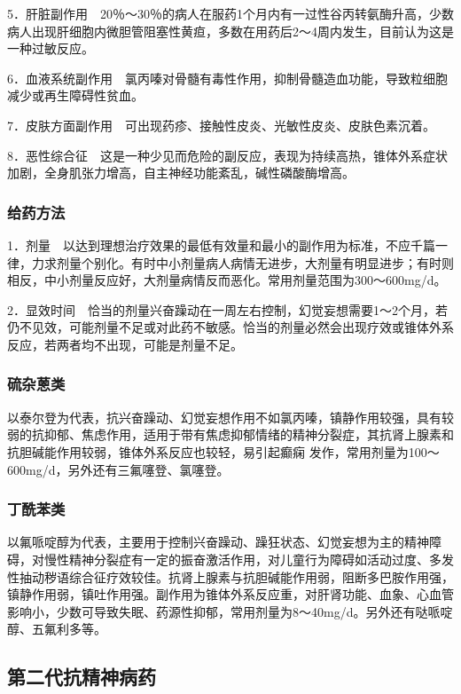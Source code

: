 5．肝脏副作用　20％～30％的病人在服药1个月内有一过性谷丙转氨酶升高，少数病人出现肝细胞内微胆管阻塞性黄疸，多数在用药后2～4周内发生，目前认为这是一种过敏反应。

6．血液系统副作用　氯丙嗪对骨髓有毒性作用，抑制骨髓造血功能，导致粒细胞减少或再生障碍性贫血。

7．皮肤方面副作用　可出现药疹、接触性皮炎、光敏性皮炎、皮肤色素沉着。

8．恶性综合征　这是一种少见而危险的副反应，表现为持续高热，锥体外系症状加剧，全身肌张力增高，自主神经功能紊乱，碱性磷酸酶增高。

\subsubsection{给药方法}

1．剂量　以达到理想治疗效果的最低有效量和最小的副作用为标准，不应千篇一律，力求剂量个别化。有时中小剂量病人病情无进步，大剂量有明显进步；有时则相反，中小剂量反应好，大剂量病情反而恶化。常用剂量范围为300～600mg/d。

2．显效时间　恰当的剂量兴奋躁动在一周左右控制，幻觉妄想需要1～2个月，若仍不见效，可能剂量不足或对此药不敏感。恰当的剂量必然会出现疗效或锥体外系反应，若两者均不出现，可能是剂量不足。

\subsubsection{硫杂蒽类}

以泰尔登为代表，抗兴奋躁动、幻觉妄想作用不如氯丙嗪，镇静作用较强，具有较弱的抗抑郁、焦虑作用，适用于带有焦虑抑郁情绪的精神分裂症，其抗肾上腺素和抗胆碱能作用较弱，锥体外系反应也较轻，易引起癫痫
发作，常用剂量为100～600mg/d，另外还有三氟噻登、氯噻登。

\subsubsection{丁酰苯类}

以氟哌啶醇为代表，主要用于控制兴奋躁动、躁狂状态、幻觉妄想为主的精神障碍，对慢性精神分裂症有一定的振奋激活作用，对儿童行为障碍如活动过度、多发性抽动秽语综合征疗效较佳。抗肾上腺素与抗胆碱能作用弱，阻断多巴胺作用强，镇静作用弱，镇吐作用强。副作用为锥体外系反应重，对肝肾功能、血象、心血管影响小，少数可导致失眠、药源性抑郁，常用剂量为8～40mg/d。另外还有哒哌啶醇、五氟利多等。

\subsection{第二代抗精神病药}

